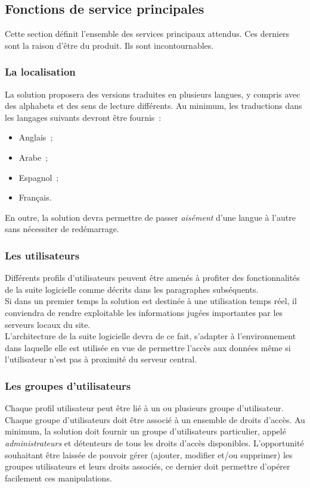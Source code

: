 \subsection{Fonctions de service principales}
Cette section définit l'ensemble des services principaux attendus. Ces derniers sont la raison d'être du produit. Ils sont incontournables.

\subsubsection{La localisation}
La solution proposera des versions traduites en plusieurs langues, y compris avec des alphabets et des sens de lecture différents. Au minimum, les traductions dans les langages suivants devront être fournis~:
\begin{itemize}
	\item Anglais~;
	\item Arabe~;
	\item Espagnol~;
	\item Français.
\end{itemize}
En outre, la solution devra permettre de passer \emph{aisément} d'une langue à l'autre sans nécessiter de redémarrage.

\subsubsection{Les utilisateurs}
Différents profils d'utilisateurs peuvent être amenés à profiter des fonctionnalités de la suite logicielle comme décrits dans les paragraphes subséquents.
\\
Si dans un premier temps la solution est destinée à une utilisation temps réel, il conviendra de rendre exploitable les informations jugées importantes par les serveurs locaux du site.
\\
L'architecture de la suite logicielle devra de ce fait, s'adapter à l'environnement dans laquelle elle est utilisée en vue de permettre l'accès aux données même si l'utilisateur n'est pas à proximité du serveur central.

\subsubsection{Les groupes d'utilisateurs}
Chaque profil utilisateur peut être lié à un ou plusieurs groupe d'utilisateur.
Chaque groupe d'utilisateurs doit être associé à un ensemble de droits d'accès.
Au minimum, la solution doit fournir un groupe d'utilisateurs particulier, appelé \emph{administrateurs} et détenteurs de tous les droits d'accès disponibles. L'opportunité souhaitant être laissée de pouvoir gérer (ajouter, modifier et/ou supprimer) les groupes utilisateurs et leurs droits associés, ce dernier doit permettre d'opérer facilement ces manipulations.

